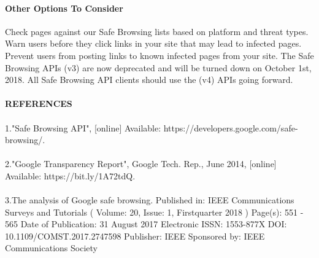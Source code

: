 \documentclass[12pt]{article}
\begin{document}
\paragraph{Other Options To Consider}
Check pages against our Safe Browsing lists based on platform and threat types.
Warn users before they click links in your site that may lead to infected pages.
Prevent users from posting links to known infected pages from your site.
The Safe Browsing APIs (v3) are now deprecated and will be turned down on October 1st, 2018. All Safe Browsing API clients should use the (v4) APIs going forward.

\paragraph{REFERENCES}
\paragraph{}
1."Safe Browsing API", [online] Available: https://developers.google.com/safe-browsing/.
\paragraph{}
2."Google Transparency Report", Google Tech. Rep., June 2014, [online] Available: https://bit.ly/1A72tdQ.
\paragraph{}
3.The analysis of Google safe browsing.
Published in: IEEE Communications Surveys and Tutorials ( Volume: 20, Issue: 1, Firstquarter 2018 )
Page(s): 551 - 565
Date of Publication: 31 August 2017
Electronic ISSN: 1553-877X
DOI: 10.1109/COMST.2017.2747598
Publisher: IEEE
Sponsored by: IEEE Communications Society
\end{document}
